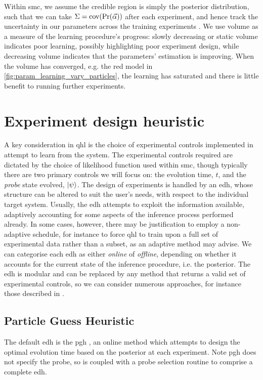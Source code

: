 Within \gls{smc}, we assume the credible region is simply the posterior distribution, 
    such that we can take $\Sigma = \textrm{cov}(\Pr(\vec{\alpha}))$ after each experiment, 
    and hence track the uncertainty in our parameters across the training experiments \cite{Granade:2012kj}.
We use \gls{volume} as a measure of the learning procedure's progress: 
    slowly decreasing or static \gls{volume} indicates poor learning, possibly highlighting poor experiment design, 
    while decreasing \gls{volume} indicates that the parameters' estimation is improving.
When the \gls{volume} has converged, e.g. the red model in \cref{fig:param_learning_vary_particles},
    the learning has saturated and there is little benefit to running further experiments. 

\section{Experiment design heuristic}\label{sec:heuristic}
A key consideration in \gls{qhl} is the choice of experimental controls implemented in attempt to learn from the system. 
The experimental controls required are dictated by the choice of  \gls{likelihood} function used within \gls{smc}, 
    though typically there are two primary controls we will focus on: 
    the evolution time, $t$, and the \emph{\gls{probe}} state evolved, $\ket{\psi}$. 
The design of experiments is handled by an \gls{edh}, 
    whose structure can be altered to suit the user's needs, with respect to the individual target system. 
Usually, the \gls{edh} attempts to exploit the information available, 
    adaptively accounting for some aspects of the inference process performed already. 
In some cases, however, there may be justification to employ a non-adaptive schedule, 
    for instance to force \gls{qhl} to train upon a full set of experimental data rather than a subset,
    as an adaptive method may advise.
We can categorise each \gls{edh} as either \emph{online} of \emph{offline},
    depending on whether it accounts for the current state of the inference procedure, i.e. the posterior.
The \gls{edh} is modular and can be replaced by any method that returns a valid set of experimental controls, 
    so we can consider numerous approaches, for instance those described in \cite{hincks2018hamiltonian, fiderer2020neural}.
\par 

\subsection{Particle Guess Heuristic}\label{sec:pgh}
The default \gls{edh} is the \gls{pgh} \cite{Wiebe:2014qhl}, 
    an online method which attempts to design the optimal evolution time based on the posterior at each experiment.
Note \gls{pgh} does not specify the \gls{probe}, so is coupled with a \gls{probe} selection routine to comprise 
    a complete \gls{edh}.
\par

